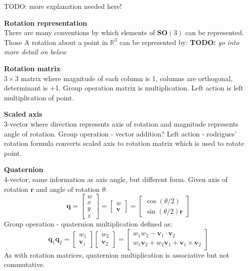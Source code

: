 		TODO: more explanation needed here!
		
		\textbf{Rotation representation}\\		
		There are many conventions by which elements of $\mathbf{SO}(3)$ can be represented. Those  A rotation about a point in $\mathbb{R}^3$ can be represented by: \textbf{TODO:} \textit{go into more detail on below}
		
		\textbf{Rotation matrix}\\
		$3 \times 3$ matrix where magnitude of each column is 1, columns are orthogonal, determinant is +1. Group operation matrix is multiplication. Left action is left multiplication of point. 
		
		\textbf{Scaled axis}\\
		3-vector where direction represents axis of rotation and magnitude represents angle of rotation. Group operation - vector addition? Left action - rodrigues' rotation formula converts scaled axis to rotation matrix which is used to rotate point.
				
		\textbf{Quaternion}\\
		4-vector, same information as axis angle, but different form. Given axis of rotation $\mathbf{r}$ and angle of rotation $\theta$:
		\begin{equation}
			\mathbf{q} = 
			\begin{bmatrix}
				w \\
				x \\
				y \\
				z
			\end{bmatrix}
			 = 
			 \begin{bmatrix}
 				w \\
 				\mathbf{v}
			 \end{bmatrix}
			 =
			 \begin{bmatrix}
			 	\cos(\theta/2) \\
			 	\sin(\theta/2)\mathbf{r}
			 \end{bmatrix}
		\end{equation}
		Group operation - quaternion multiplication defined as:
		\begin{equation}
			\mathbf{q}_1\mathbf{q}_2 =
			\begin{bmatrix}
			 	w_1 \\
			 	\mathbf{v}_1
			\end{bmatrix} 
			\begin{bmatrix}
			 	w_2 \\
			 	\mathbf{v}_2
			\end{bmatrix} 
			=
			\begin{bmatrix}
			 	w_1w_2 - \mathbf{v}_1 \cdot \mathbf{v}_2 \\
			 	w_1\mathbf{v}_2 + w_2\mathbf{v}_1 + \mathbf{v}_1 \times \mathbf{v}_2
			\end{bmatrix} 
		\end{equation} 
		As with rotation matrices, quaternion multiplication is associative but not commutative.
		
